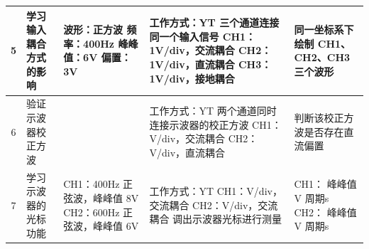 \documentclass[12pt,a4paper]{article}
\begin{document}
\begin{longtable}{|c|p{2cm}|p{2.5cm}|p{4.5cm}|p{4cm}|}
        \hline
        5 & 学习输入耦合方式的影响 & 波形：正方波 \newline 频率：400Hz \newline 峰峰值：6V \newline 偏置：3V & 工作方式：YT \newline 三个通道连接同一个输入信号 \newline CH1：1V/div，交流耦合 \newline CH2：1V/div，直流耦合 \newline CH3：1V/div，接地耦合 & 同一坐标系下绘制 CH1、CH2、CH3 三个波形  \\
        \hline
        6 & 验证示波器校正方波 & & 工作方式：YT \newline 两个通道同时连接示波器的校正方波 \newline CH1：\uline{\phantom{\hspace{2cm}}}V/div，交流耦合 \newline CH2：\uline{\phantom{\hspace{2cm}}}V/div，直流耦合 & 判断该校正方波是否存在直流偏置  \\
        \hline
        7 & 学习示波器的光标功能 & CH1：400Hz 正弦波，峰峰值 8V \newline CH2：600Hz 正弦波，峰峰值 6V & 工作方式：YT \newline CH1：\uline{\phantom{\hspace{2cm}}}V/div，交流耦合 \newline CH2：\uline{\phantom{\hspace{2cm}}}V/div，交流耦合 \newline 调出示波器光标进行测量 & CH1： \newline 峰峰值\uline{\phantom{\hspace{2cm}}}V \newline 周期\uline{\phantom{\hspace{2cm}}}s \newline CH2： \newline 峰峰值\uline{\phantom{\hspace{2cm}}}V \newline 周期\uline{\phantom{\hspace{2cm}}}s \\
        \hline

\end{longtable}
\end{document}
